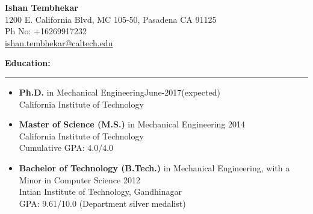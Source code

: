 \documentclass[10pt,fleqn]{article}
\begin{document}
\thispagestyle{empty}
\begin{center}
\LARGE \textbf{Ishan Tembhekar} \small \\[0.16cm]
1200 E. California Blvd, MC 105-50, Pasadena CA 91125 \\
Ph No: +16269917232 \\
\href{mailto:ishan.tembhekar@caltech.edu}{ishan.tembhekar@caltech.edu} \hfill
\end{center}
\textbf{Education:}
\vspace{-25pt}
\begin{center}
\rule{\textwidth}{.4pt}
\end{center}
\vspace{-15pt}
\begin{itemize}
\setlength{\itemsep}{5pt}
\setlength{\parskip}{0pt}
\setlength{\itemindent}{-5mm}
\item[] \textbf{Ph.D.} in Mechanical Engineering\hfill  June-2017(expected)\\
		California Institute of Technology
\item[] \textbf{Master of Science (M.S.)} in Mechanical Engineering \hfill 2014\\
		California Institute of Technology\\
		Cumulative GPA: 4.0/4.0 
\item[] \textbf{Bachelor of Technology (B.Tech.)} in Mechanical Engineering, with a Minor in Computer Science \hfill 2012\\
		Intian Institute of Technology, Gandhinagar\\
		GPA: 9.61/10.0 (Department silver medalist) 
\end{itemize}
\end{document}
